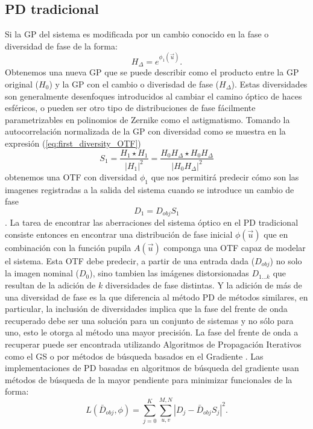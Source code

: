 \subsection{PD tradicional}
\label{sec:ChPD_PD_tradicional}
Si la GP del sistema es modificada por un cambio conocido en la fase o
diversidad de fase de la forma:
$$H_{\Delta}=e^{\phi_1(\vec{u})}.$$ 
Obtenemos una nueva GP que se puede describir como el producto entre
la GP original ($H_{0}$) y la GP con el cambio o diverisdad de fase
($H_{\Delta}$). Estas diversidades son generalmente desenfoques
introducidos al cambiar el camino óptico de haces esféricos, o pueden
ser otro tipo de distribuciones de fase fácilmente parametrizables en
polinomios de Zernike como el astigmatismo. Tomando la autocorrelación normalizada de la GP con
diversidad como se muestra en la expresión (\ref{eq:first_diversity_OTF})
\begin{equation}\label{eq:first_diversity_OTF}
S_1 = \frac{H_1\star H_1}{|H_1|^2} = \frac{H_0H_{\Delta} \star H_0H_{\Delta}}{|H_0H_{\Delta}|^2}
\end{equation}
obtenemos una OTF con diversidad $\phi_1$ que nos permitirá predecir cómo son
las imagenes registradas a la salida del sistema cuando se introduce
un cambio de fase $$D_1 = D_{obj} S_1$$. 
La tarea de encontrar las aberraciones del sistema óptico en el PD
tradicional consiste entonces en encontrar una distribución de fase
inicial $\phi(\vec{u})$ que en combinación con la función pupila
$A(\vec{u})$ componga una OTF capaz de modelar el
sistema. Esta OTF debe predecir, a partir de una entrada dada 
($D_{obj}$)  no solo la imagen nominal ($D_0$), sino tambien
las imágenes distorsionadas $D_{1...k}$ que resultan de la adición de
$k$ diversidades de fase distintas. Y la adición de más de una
diversidad de fase es la que diferencia al método PD de métodos
similares, en particular, la inclusión de diversidades implica que la
fase del frente de onda recuperado debe ser una solución para un
conjunto de sistemas y no sólo para uno, esto le otorga al método una
mayor precisión.  La fase del frente de onda a recuperar puede ser
encontrada utilizando Algoritmos de Propagación Iterativos como el GS o por
métodos de búsqueda basados en el Gradiente .
Las implementaciones de PD basadas en algoritmos de búsqueda del
gradiente usan métodos de búsqueda de la mayor pendiente para
minimizar funcionales de la forma:
\begin{equation}\label{eq:metric}
L(\bar{D}_{obj}, \phi)= \sum_{j=0}^{K} \sum_{u,v}^{M,N}  \left |D_{j} - \bar{D}_{obj} S_{j} \right | ^2.
\end{equation}

